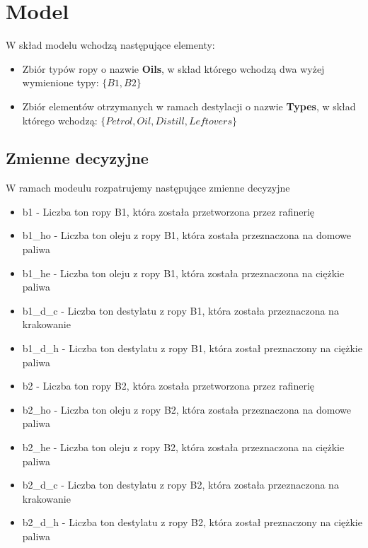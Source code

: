 \documentclass[a4paper,14pt]{report}
\begin{document}
\section{Model}
    W skład modelu wchodzą następujące elementy:
    \begin{itemize}
        \item Zbiór typów ropy o nazwie \textbf{Oils}, w skład którego wchodzą dwa wyżej wymienione typy: $\{B1,B2\}$
        \item Zbiór elementów otrzymanych w ramach destylacji o nazwie \textbf{Types}, w skład którego wchodzą: $\{Petrol,Oil,Distill,Leftovers\}$
    \end{itemize}
    \subsection{Zmienne decyzyjne}
        W ramach modeulu rozpatrujemy następujące zmienne decyzyjne
        \begin{itemize}
            \item b1 - Liczba ton ropy B1, która została przetworzona przez rafinerię
            \item b1\_ho - Liczba ton oleju z ropy B1, która została przeznaczona na domowe paliwa
            \item b1\_he - Liczba ton oleju z ropy B1, która została przeznaczona na ciężkie paliwa
            \item b1\_d\_c - Liczba ton destylatu z ropy B1, która została przeznaczona na krakowanie
            \item b1\_d\_h - Liczba ton destylatu z ropy B1, która został preznaczony na ciężkie paliwa
            \item b2 - Liczba ton ropy B2, która została przetworzona przez rafinerię
            \item b2\_ho - Liczba ton oleju z ropy B2, która została przeznaczona na domowe paliwa
            \item b2\_he -  Liczba ton oleju z ropy B2, która została przeznaczona na ciężkie paliwa
            \item b2\_d\_c - Liczba ton destylatu z ropy B2, która została przeznaczona na krakowanie
            \item b2\_d\_h - Liczba ton destylatu z ropy B2, która został preznaczony na ciężkie paliwa
        \end{itemize}
\end{document}
